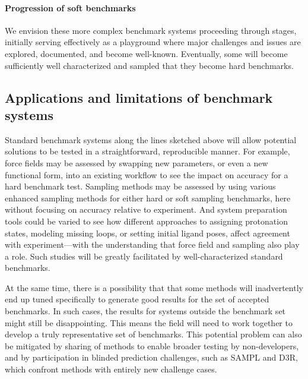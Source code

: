 \documentclass[aps,pre,twocolumn,nofootinbib,superscriptaddress,10pt, final,tightenlines]{revtex4-1}
\begin{document}
\paragraph{Progression of soft benchmarks} We envision these more complex benchmark systems proceeding through stages, initially serving effectively as a playground where major challenges and issues are explored, documented, and become well-known. 
Eventually, some will become sufficiently well characterized and sampled that they become hard benchmarks.

\subsection{Applications and limitations of benchmark systems}
Standard benchmark systems along the lines sketched above will allow potential solutions to be tested in a straightforward, reproducible manner. 
For example, force fields may be assessed by swapping new parameters, or even a new functional form, into an existing workflow to see the impact on accuracy for a hard benchmark test.
Sampling methods may be assessed by using various enhanced sampling methods for either hard or soft sampling benchmarks, here without focusing on accuracy relative to experiment.
And system preparation tools could be varied to see how different approaches to assigning protonation states, modeling missing loops, or setting initial ligand poses, affect agreement with experiment---with the understanding that force field and sampling also play a role. 
Such studies will be greatly facilitated by well-characterized standard benchmarks.

At the same time, there is a possibility that that some methods will inadvertently end up tuned specifically to generate good results for the set of accepted benchmarks. 
In such cases, the results for systems outside the benchmark set might still be disappointing. 
This means the field will need to work together to develop a truly representative set of benchmarks.
This potential problem can also be mitigated by sharing of methods to enable broader testing by non-developers, and by participation in blinded prediction challenges, such as SAMPL and D3R, which confront methods with entirely new challenge cases. 
\end{document}
